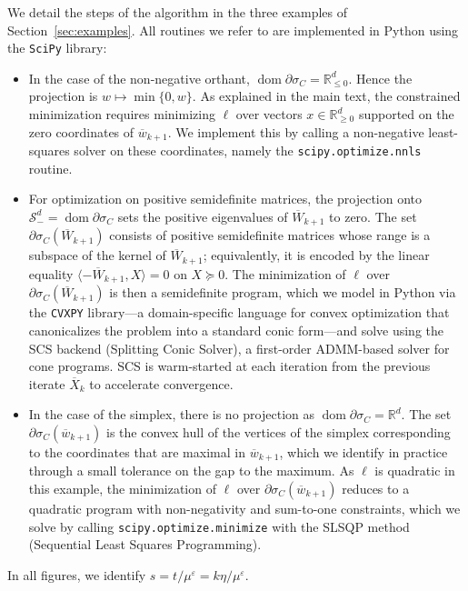 \documentclass[11pt,english,reqno]{article}
\DeclareMathOperator{\dom}{dom}
\newcommand{\R}{\mathbb{R}}
\renewcommand{\leq}{\leqslant}
\renewcommand{\geq}{\geqslant}
\theoremstyle{plain}
\theoremstyle{definition}
\theoremstyle{remark}
\numberwithin{equation}{section}
\begin{document}
We detail the steps of the algorithm in the three examples of Section~\ref{sec:examples}. All routines we refer to are implemented in Python using the \texttt{SciPy} library:
\begin{itemize}
	\item In the case of the non-negative orthant, $\dom \partial \sigma_C = \R_{\leq 0}^d$. Hence the projection is $w \mapsto \min \{0, w\}$. As explained in the main text, the constrained minimization requires minimizing $\ell$ over vectors $x \in \R^d_{\geq 0}$ supported on the zero coordinates of $\overline{w}_{k+1}$. We implement this by calling a non-negative least-squares solver on these coordinates, namely the \texttt{scipy.optimize.nnls} routine.
	\item For optimization on positive semidefinite matrices, the projection onto $\mathcal{S}^d_- = \dom \partial \sigma_C$ sets the positive eigenvalues of $\overline{W}_{k+1}$ to zero. The set $\partial \sigma_C(\overline{W}_{k+1})$ consists of positive semidefinite matrices whose range is a subspace of the kernel of $\overline{W}_{k+1}$; equivalently, it is encoded by the linear equality $\langle -\overline{W}_{k+1}, X \rangle = 0$ on $X \succeq 0$. The minimization of $\ell$ over $\partial \sigma_C(\overline{W}_{k+1})$ is then a semidefinite program, which we model in Python via the \texttt{CVXPY} library---a domain-specific language for convex optimization that canonicalizes the problem into a standard conic form---and solve using the SCS backend (Splitting Conic Solver), a first-order ADMM-based solver for cone programs. SCS is warm-started at each iteration from the previous iterate $\overline{X}_k$ to accelerate convergence.
	\item In the case of the simplex, there is no projection as $\dom \partial \sigma_C = \R^d$. The set $\partial \sigma_C(\overline{w}_{k+1})$ is the convex hull of the vertices of the simplex corresponding to the coordinates that are maximal in $\overline{w}_{k+1}$, which we identify in practice through a small tolerance on the gap to the maximum. As $\ell$ is quadratic in this example, the minimization of $\ell$ over $\partial \sigma_C(\overline{w}_{k+1})$ reduces to a quadratic program with non-negativity and sum-to-one constraints, which we solve by calling \texttt{scipy.optimize.minimize} with the SLSQP method (Sequential Least Squares Programming).
\end{itemize}

In all figures, we identify $s = t/\mu^\varepsilon = k\eta / \mu^\varepsilon$.
\end{document}
